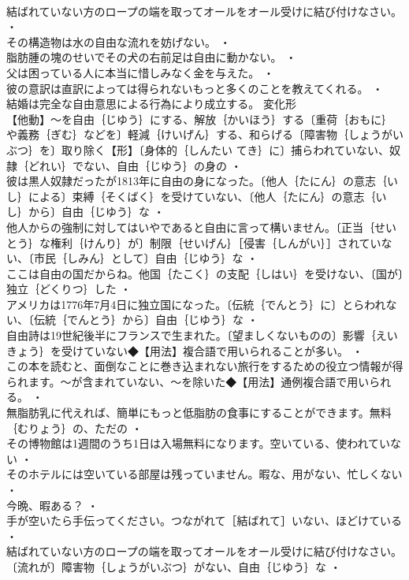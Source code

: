 \documentclass[8pt]{extreport}
\begin{document}
\begin{CJK}{UTF8}{min}
\\	結ばれていない方のロープの端を取ってオールをオール受けに結び付けなさい。 ・
\\	その構造物は水の自由な流れを妨げない。 ・
\\	脂肪腫の塊のせいでその犬の右前足は自由に動かない。 ・
\\	父は困っている人に本当に惜しみなく金を与えた。 ・
\\	彼の意訳は直訳によっては得られないもっと多くのことを教えてくれる。 ・
\\	結婚は完全な自由意思による行為により成立する。	変化形 
\\	【他動】～を自由｛じゆう｝にする、解放｛かいほう｝する〔重荷｛おもに｝や義務｛ぎむ｝などを〕軽減｛けいげん｝する、和らげる〔障害物｛しょうがいぶつ｝を〕取り除く【形】〔身体的｛しんたい てき｝に〕捕らわれていない、奴隷｛どれい｝でない、自由｛じゆう｝の身の ・
\\	彼は黒人奴隷だったが1813年に自由の身になった。〔他人｛たにん｝の意志｛いし｝による〕束縛｛そくばく｝を受けていない、〔他人｛たにん｝の意志｛いし｝から〕自由｛じゆう｝な ・
\\	他人からの強制に対してはいやであると自由に言って構いません。〔正当｛せいとう｝な権利｛けんり｝が〕制限｛せいげん｝［侵害｛しんがい｝］されていない、〔市民｛しみん｝として〕自由｛じゆう｝な ・
\\	ここは自由の国だからね。他国｛たこく｝の支配｛しはい｝を受けない、〔国が〕独立｛どくりつ｝した ・
\\	アメリカは1776年7月4日に独立国になった。〔伝統｛でんとう｝に〕とらわれない、〔伝統｛でんとう｝から〕自由｛じゆう｝な ・
\\	自由詩は19世紀後半にフランスで生まれた。〔望ましくないものの〕影響｛えいきょう｝を受けていない◆【用法】複合語で用いられることが多い。 ・
\\	この本を読むと、面倒なことに巻き込まれない旅行をするための役立つ情報が得られます。～が含まれていない、～を除いた◆【用法】通例複合語で用いられる。 ・
\\	無脂肪乳に代えれば、簡単にもっと低脂肪の食事にすることができます。無料｛むりょう｝の、ただの ・
\\	その博物館は1週間のうち1日は入場無料になります。空いている、使われていない ・
\\	そのホテルには空いている部屋は残っていません。暇な、用がない、忙しくない ・
\\	今晩、暇ある？ ・
\\	手が空いたら手伝ってください。つながれて［結ばれて］いない、ほどけている ・
\\	結ばれていない方のロープの端を取ってオールをオール受けに結び付けなさい。〔流れが〕障害物｛しょうがいぶつ｝がない、自由｛じゆう｝な ・

\end{CJK}
\end{document}

